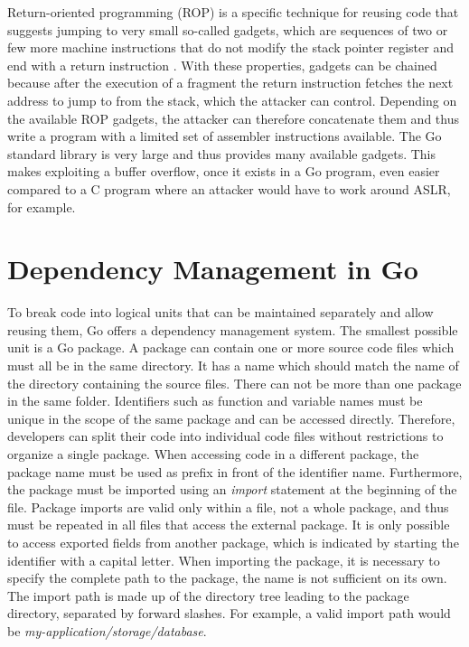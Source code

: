 Return-oriented programming (\acrshort{ROP}) is a specific technique for reusing code that suggests jumping to very
small so-called gadgets, which are sequences of two or few more machine instructions that do not modify the stack
pointer register and end with a return instruction .
With these properties, gadgets can be chained because after the execution of a fragment the return instruction fetches
the next address to jump to from the stack, which the attacker can control.
Depending on the available \acrshort{ROP} gadgets, the attacker can therefore concatenate them and thus write a program
with a limited set of assembler instructions available.
The Go standard library is very large and thus provides many available gadgets.
This makes exploiting a buffer overflow, once it exists in a Go program, even easier compared to a C program where an
attacker would have to work around \acrshort{ASLR}, for example.



\section{Dependency Management in Go}\label{sec:background:dependencies}

To break code into logical units that can be maintained separately and allow reusing them, Go offers a dependency
management system.
The smallest possible unit is a Go package.
A package can contain one or more source code files which must all be in the same directory.
It has a name which should match the name of the directory containing the source files.
There can not be more than one package in the same folder.
Identifiers such as function and variable names must be unique in the scope of the same package and can be accessed
directly.
Therefore, developers can split their code into individual code files without restrictions to organize a single package.
When accessing code in a different package, the package name must be used as prefix in front of the identifier name.
Furthermore, the package must be imported using an \textit{import} statement at the beginning of the file.
Package imports are valid only within a file, not a whole package, and thus must be repeated in all files that access
the external package.
It is only possible to access exported fields from another package, which is indicated by starting the identifier with
a capital letter.
When importing the package, it is necessary to specify the complete path to the package, the name is not sufficient on
its own.
The import path is made up of the directory tree leading to the package directory, separated by forward slashes.
For example, a valid import path would be \textit{my-application/storage/database}.


